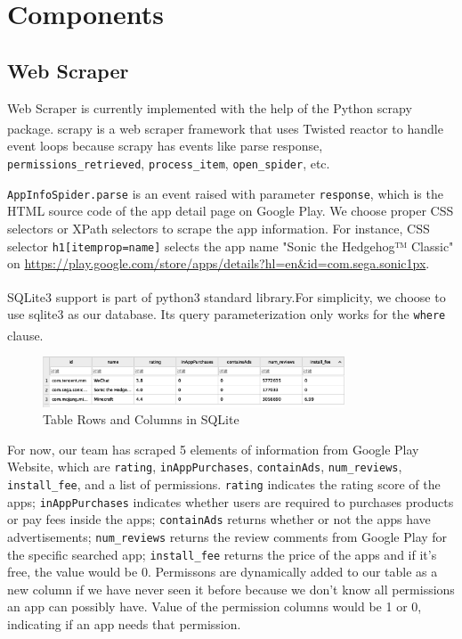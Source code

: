 \documentclass[12pt, a4paper]{article}
\newcommand{\code}[1]{\texttt{#1}}
\begin{document}
\section{Components}
\subsection{Web Scraper}
Web Scraper is currently implemented with the help of the Python scrapy package\textsuperscript{\cite{scrapy}}. scrapy is a web scraper framework that uses Twisted reactor\textsuperscript{\cite{reactor}} to handle event loops because scrapy has events like parse response, \code{permissions\linebreak[2]\_retrieved}, \code{process\_item}, \code{open\_spider}, etc.

\code{AppInfoSpider.parse} is an event raised with parameter \code{response}, which is the HTML source code of the app detail page on Google Play. We choose proper CSS selectors or XPath selectors to scrape the app information. For instance, CSS selector \code{h1[itemprop=name]} selects the app name "Sonic the Hedgehog™ Classic" on \url{https://play.google.com/store/apps/details?hl=en&id=com.sega.sonic1px}.

SQLite3 support is part of python3 standard library.\textsuperscript{\cite{python-sqlite}}For simplicity, we choose to use sqlite3 as our database. Its query parameterization only works for the \code{where} clause.\textsuperscript{\cite{sqliteC++}}

\begin{figure}[ht]
\centering
\includegraphics[width=0.8\textwidth]{critical_information.png}
\caption{Table Rows and Columns in SQLite}
\label{fig:critical-information}
\end{figure}

For now, our team has scraped 5 elements of information from Google Play Website, which are \code{rating}, \code{inAppPurchases}, \code{containAds}, \code{num\linebreak[4]\_reviews}, \code{install\_fee}, and a list of permissions. \code{rating} indicates the rating score of the apps; \code{inAppPurchases} indicates whether users are required to purchases products or pay fees inside the apps; \code{containAds} returns whether or not the apps have advertisements; \code{num\linebreak[2]\_reviews} returns the review comments from Google Play for the specific searched app; \code{install\_fee} returns the price of the apps and if it’s free, the value would be 0. Permissons are dynamically added to our table as a new column if we have never seen it before because we don't know all permissions an app can possibly have. Value of the permission columns would be 1 or 0, indicating if an app needs that permission.
\end{document}
